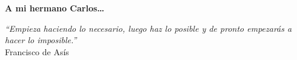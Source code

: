 \thispagestyle{empty}

\begin{flushright}

  \vspace*{\fill}
  \textbf{A mi hermano Carlos\ldots}\\

  \vspace{3cm}

  \emph{``Empieza haciendo lo necesario, luego haz lo posible y de
    pronto empezarás a hacer lo imposible.''}\\ Francisco de Asís

\end{flushright}  

\vspace{4cm}
\vspace*{\fill}